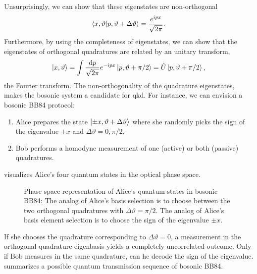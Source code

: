 Unsurprisingly, we can show that these eigenstates are non-orthogonal~\cite[p.~29]{Mukhanov2007}
\begin{equation}
	\braket{x,\vartheta}{p,\vartheta+\Delta\vartheta}
	=
	\frac{e^{ipx}}{\sqrt{2\pi}}
	\label{eq:position_momentum_product}
	.
\end{equation}
Furthermore, by using the completeness of eigenstates, we can show that the eigenstates of orthogonal quadratures are related by an unitary transform,
\begin{equation}
	\ket{x,\vartheta}
	=
	\int\frac{\dd{p}}{\sqrt{2\pi}}
	e^{-ipx}
	\ket{p,\vartheta+\pi/2}
	=
	\hat{U}
	\ket{p,\vartheta+\pi/2}
	,
\end{equation}
the Fourier transform.
The non-orthogonality of the quadrature eigenstates, makes the bosonic system a candidate for \gls{qkd}.
For instance, we can envision a bosonic BB84 protocol:
\begin{enumerate}
	\item Alice prepares the state $\ket{\pm x,\vartheta+\Delta\vartheta}$ where she randomly picks the sign of the eigenvalue $\pm x$ and $\Delta\vartheta=0,\pi/2$.
	\item Bob performs a homodyne measurement of one (active) or both (passive) quadratures.
\end{enumerate}
 visualizes Alice's four quantum states in the optical phase space.
\begin{figure}[htb]
	\centering
	
	\caption{Phase space representation of Alice's quantum states in bosonic BB84: The analog of Alice's basis selection is to choose between the two orthogonal quadratures with $\Delta\vartheta=\pi/2$. The analog of Alice's basis element selection is to choose the sign of the eigenvalue $\pm x$.}\label{fig:phase_space_quadrature}
\end{figure}
If she chooses the quadrature corresponding to $\Delta\vartheta=0$, a measurement in the orthogonal quadrature eigenbasis yields a completely uncorrelated outcome.
Only if Bob measures in the same quadrature, can he decode the sign of the eigenvalue.
 summarizes a possible quantum transmission sequence of bosonic BB84.
